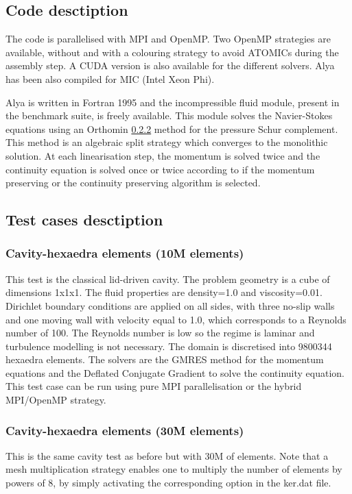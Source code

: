 \subsection{Code desctiption}
The code is parallelised with MPI and OpenMP. Two OpenMP strategies are available, without and with a colouring strategy to avoid ATOMICs during the assembly step. A CUDA version is also available for the different solvers. Alya has been also compiled for MIC (Intel Xeon Phi).

Alya is written in Fortran 1995 and the incompressible fluid module, present in the benchmark suite, is freely available. This module solves the Navier-Stokes equations using an Orthomin \ref{} method for the pressure Schur complement. This method is an algebraic split strategy which converges to the monolithic solution. At each linearisation step, the momentum is solved twice and the continuity equation is solved once or twice according to if the momentum preserving or the continuity preserving algorithm is selected.

\subsection{Test cases desctiption}
\subsubsection{Cavity-hexaedra elements (10M elements)}
This test is the classical lid-driven cavity. The problem geometry is a cube of dimensions 1x1x1. The fluid properties are density=1.0 and viscosity=0.01. Dirichlet boundary conditions are applied on all sides, with three no-slip walls and one moving wall with velocity equal to 1.0, which corresponds to a Reynolds number of 100. The Reynolds number is low so the regime is laminar and turbulence modelling is not necessary. The domain is discretised into 9800344 hexaedra elements. The solvers are the GMRES method for the momentum equations and the Deflated Conjugate Gradient to solve the continuity equation. This test case can be run using pure MPI parallelisation or the hybrid MPI/OpenMP strategy.

\subsubsection{Cavity-hexaedra elements (30M elements)}
This is the same cavity test as before but with 30M of elements. Note that a mesh multiplication strategy enables one to multiply the number of elements by powers of 8, by simply activating the corresponding option in the ker.dat file.

